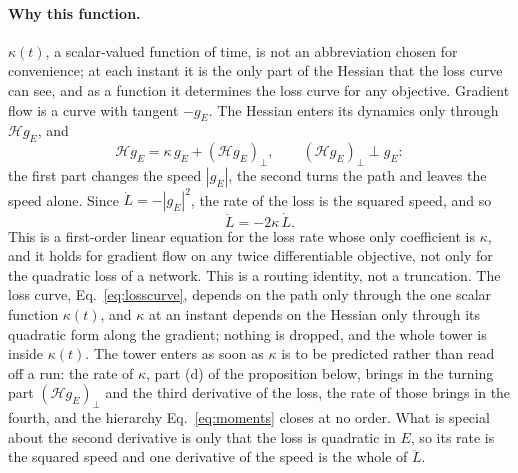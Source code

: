 \documentclass[11pt]{article}
\theoremstyle{definition}
\theoremstyle{remark}
\newcommand{\Hess}{\mathcal{H}}          %
\begin{document}
\paragraph{Why this function.}
$\kappa(t)$, a scalar-valued function of time, is not an abbreviation chosen for convenience; at each instant it is the only part of the Hessian that the loss curve can see, and as a function it determines the loss curve for any objective.
Gradient flow is a curve with tangent $-g_E$.
The Hessian enters its dynamics only through $\Hess g_E$, and
\begin{equation}\label{eq:Hsplit}
\Hess g_E = \kappa\,g_E + (\Hess g_E)_\perp,\qquad (\Hess g_E)_\perp\perp g_E :
\end{equation}
the first part changes the speed $|g_E|$, the second turns the path and leaves the speed alone.
Since $\dot L = -|g_E|^2$, the rate of the loss is the squared speed, and so
\begin{equation}\label{eq:Lddot}
\ddot L = -2\kappa\,\dot L .
\end{equation}
This is a first-order linear equation for the loss rate whose only coefficient is $\kappa$, and it holds for gradient flow on any twice differentiable objective, not only for the quadratic loss of a network.
This is a routing identity, not a truncation.
The loss curve, Eq.~\eqref{eq:losscurve}, depends on the path only through the one scalar function $\kappa(t)$, and $\kappa$ at an instant depends on the Hessian only through its quadratic form along the gradient; nothing is dropped, and the whole tower is inside $\kappa(t)$.
The tower enters as soon as $\kappa$ is to be predicted rather than read off a run: the rate of $\kappa$, part (d) of the proposition below, brings in the turning part $(\Hess g_E)_\perp$ and the third derivative of the loss, the rate of those brings in the fourth, and the hierarchy Eq.~\eqref{eq:moments} closes at no order.
What is special about the second derivative is only that the loss is quadratic in $E$, so its rate is the squared speed and one derivative of the speed is the whole of $\ddot L$.
\end{document}
